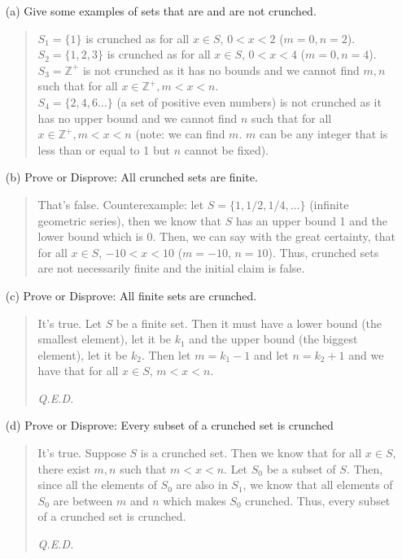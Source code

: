 \documentclass[12pt, a4paper]{article}                      %
\begin{document}
\begin{itemize}
\begin{itemize}
\item[(a)]
Give some examples of sets that are and are not crunched.
\begin{quote}
$S_1 = \{1\}$ is crunched as for all $x \in S$, $0 < x < 2$ ($m = 0, n = 2$).\\
$S_2 = \{1, 2, 3\}$ is crunched as for all $x \in S$, $0 < x < 4$ ($m = 0, n = 4$).\\
$S_3 = \mathbb{Z^+}$ is not crunched as it has no bounds and we cannot find $m, n$ such that for all $x \in \mathbb{Z^+}, m< x < n$.\\
$S_4 = \{2,4,6 ...\}$ (a set of positive even numbers) is not crunched as it has no upper bound and we cannot find $n$ such that for all $x \in \mathbb{Z^+}, m< x < n$ (note: we can find $m$. $m$ can be any integer that is less than or equal to 1 but $n$ cannot be fixed).
\end{quote}

\item[]

\item[(b)]
Prove or Disprove: All crunched sets are finite.
\begin{quote}
That's false. Counterexample: let $S = \{1, 1/2, 1/4, ...\}$ (infinite geometric series), then we know that $S$ has an upper bound 1 and the lower bound which is 0. Then, we can say with the great certainty, that for all $x \in S$, $-10 < x < 10$ ($m = -10$, $n = 10$).
Thus, crunched sets are not necessarily finite and the initial claim is false.
\end{quote} 

\item[]

\item[(c)]
Prove or Disprove: All finite sets are crunched.
\begin{quote}
It's true. Let $S$ be a finite set. Then it must have a lower bound (the smallest element), let it be $k_1$ and the upper bound (the biggest element), let it be $k_2$. Then let $m = k_1 - 1$ and let $n = k_2 + 1$ and we have that for all $x \in S$, $m < x < n$.
\begin{flushright}
\textit{Q.E.D.}
\end{flushright}
\end{quote}

\item[]

\item[(d)]
Prove or Disprove: Every subset of a crunched set is crunched
\begin{quote}
It's true. Suppose $S$ is a crunched set. Then we know that for all $x \in S$, there exist $m, n$ such that $m < x < n$. Let $S_0$ be a subset of $S$. Then, since all the elements of $S_0$ are also in $S_1$, we know that all elements of $S_0$ are between $m$ and $n$ which makes $S_0$ crunched. Thus, every subset of a crunched set is crunched.
\begin{flushright}
\textit{Q.E.D.}
\end{flushright}
\end{quote}


\end{itemize}
\end{itemize}
\end{document}
